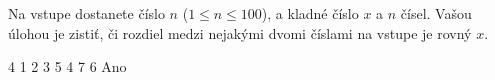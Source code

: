 




Na vstupe dostanete číslo $n$ ($1\leq n \leq 100$), a kladné číslo $x$ a $n$ čísel. Vašou úlohou je
zistiť, či rozdiel medzi nejakými dvomi číslami na vstupe je rovný $x$.

 4
1 2 3 5 4 7 6
\vystup
Ano\koniec


